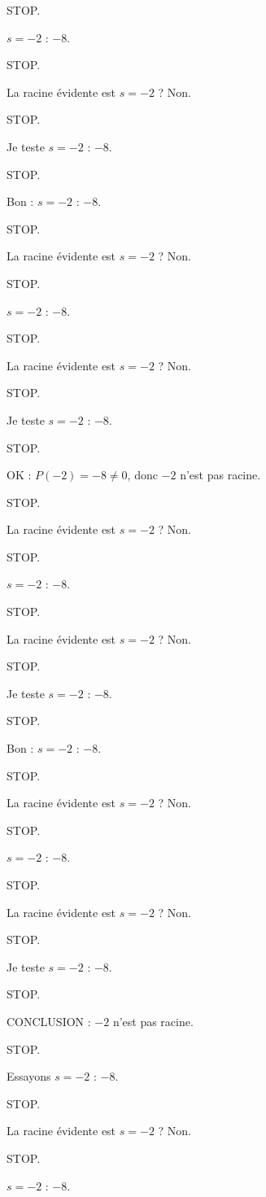 \documentclass[11pt]{article}
\begin{document}
\begin{exoresolu}
\begin{enumerate}
STOP. 

$s = -2$ : $-8$. 

STOP. 

La racine évidente est $s = -2$ ? Non. 

STOP. 

Je teste $s = -2$ : $-8$. 

STOP. 

Bon : $s = -2$ : $-8$. 

STOP. 

La racine évidente est $s = -2$ ? Non. 

STOP. 

$s = -2$ : $-8$. 

STOP. 

La racine évidente est $s = -2$ ? Non. 

STOP. 

Je teste $s = -2$ : $-8$. 

STOP. 

OK : $P(-2) = -8 \neq 0$, donc $-2$ n'est pas racine. 

STOP. 

La racine évidente est $s = -2$ ? Non. 

STOP. 

$s = -2$ : $-8$. 

STOP. 

La racine évidente est $s = -2$ ? Non. 

STOP. 

Je teste $s = -2$ : $-8$. 

STOP. 

Bon : $s = -2$ : $-8$. 

STOP. 

La racine évidente est $s = -2$ ? Non. 

STOP. 

$s = -2$ : $-8$. 

STOP. 

La racine évidente est $s = -2$ ? Non. 

STOP. 

Je teste $s = -2$ : $-8$. 

STOP. 

CONCLUSION : $-2$ n'est pas racine. 

STOP. 

Essayons $s = -2$ : $-8$. 

STOP. 

La racine évidente est $s = -2$ ? Non. 

STOP. 

$s = -2$ : $-8$. 


\end{enumerate}
\end{exoresolu}
\end{document}

